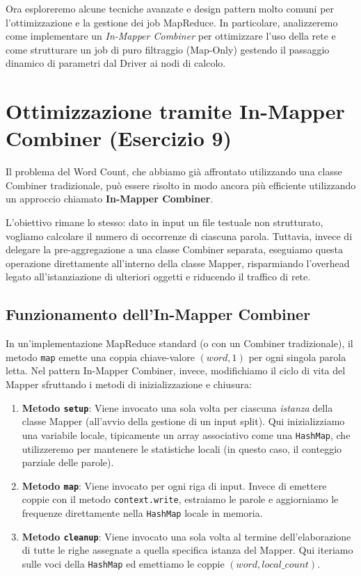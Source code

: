 Ora esploreremo alcune tecniche avanzate e design pattern molto comuni per l'ottimizzazione e la gestione dei job MapReduce. In particolare, analizzeremo come implementare un \textit{In-Mapper Combiner} per ottimizzare l'uso della rete e come strutturare un job di puro filtraggio (Map-Only) gestendo il passaggio dinamico di parametri dal Driver ai nodi di calcolo.

\section{Ottimizzazione tramite In-Mapper Combiner (Esercizio 9)}

Il problema del Word Count, che abbiamo già affrontato utilizzando una classe Combiner tradizionale, può essere risolto in modo ancora più efficiente utilizzando un approccio chiamato \textbf{In-Mapper Combiner}. 

L'obiettivo rimane lo stesso: dato in input un file testuale non strutturato, vogliamo calcolare il numero di occorrenze di ciascuna parola. Tuttavia, invece di delegare la pre-aggregazione a una classe Combiner separata, eseguiamo questa operazione direttamente all'interno della classe Mapper, risparmiando l'overhead legato all'istanziazione di ulteriori oggetti e riducendo il traffico di rete.

\subsection{Funzionamento dell'In-Mapper Combiner}
In un'implementazione MapReduce standard (o con un Combiner tradizionale), il metodo \texttt{map} emette una coppia chiave-valore \((word, 1)\) per ogni singola parola letta. Nel pattern In-Mapper Combiner, invece, modifichiamo il ciclo di vita del Mapper sfruttando i metodi di inizializzazione e chiusura:

\begin{enumerate}
    \item \textbf{Metodo \texttt{setup}}: Viene invocato una sola volta per ciascuna \textit{istanza} della classe Mapper (all'avvio della gestione di un input split). Qui inizializziamo una variabile locale, tipicamente un array associativo come una \texttt{HashMap}, che utilizzeremo per mantenere le statistiche locali (in questo caso, il conteggio parziale delle parole).
    \item \textbf{Metodo \texttt{map}}: Viene invocato per ogni riga di input. Invece di emettere coppie con il metodo \texttt{context.write}, estraiamo le parole e aggiorniamo le frequenze direttamente nella \texttt{HashMap} locale in memoria.
    \item \textbf{Metodo \texttt{cleanup}}: Viene invocato una sola volta al termine dell'elaborazione di tutte le righe assegnate a quella specifica istanza del Mapper. Qui iteriamo sulle voci della \texttt{HashMap} ed emettiamo le coppie \((word, local\_count)\).
\end{enumerate}

